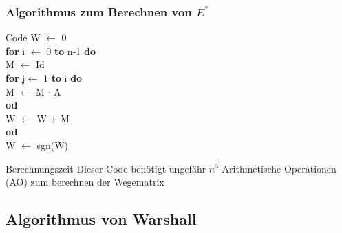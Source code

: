 \documentclass{beamer}
\begin{document}
\begin{frame}
	\frametitle{Algorithmus zum Berechnen von $E^*$}
	\begin{block}{Code}
		W $\leftarrow$ 0\\
		\textbf{for} i $\leftarrow$ 0 \textbf{to} n-1 \textbf{do}\\
		\hspace{0.5 cm}M $\leftarrow$ Id\\
		\hspace{0.5 cm}\textbf{for} j$\leftarrow$ 1 \textbf{to} i \textbf{do}\\
		\hspace{1 cm}M $\leftarrow$ M $\cdot$ A\\
		\hspace{0.5 cm}\textbf{od}\\
		\hspace{0.5 cm}W $\leftarrow$ W + M\\
		\textbf{od} \\
		W $\leftarrow$ sgn(W)
	\end{block}
	\begin{block}{Berechnungszeit}
	Dieser Code benötigt ungef\"ahr $n^5$ Arithmetische Operationen (AO) zum berechnen der Wegematrix
	\end{block}
\end{frame}

\subsection{Algorithmus von Warshall}
\end{document}
